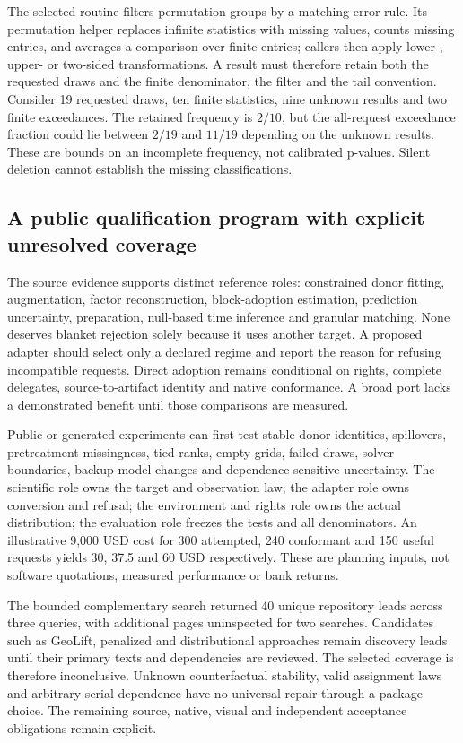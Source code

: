 The selected routine filters permutation groups by a matching-error rule.
Its permutation helper replaces infinite statistics with missing values,
counts missing entries, and averages a comparison over finite entries;
callers then apply lower-, upper- or two-sided transformations. A result
must therefore retain both the requested draws and the finite denominator,
the filter and the tail convention. Consider 19 requested draws, ten finite
statistics, nine unknown results and two finite exceedances. The retained
frequency is $2/10$, but the all-request exceedance fraction could lie
between $2/19$ and $11/19$ depending on the unknown results. These are bounds
on an incomplete frequency, not calibrated p-values. Silent deletion cannot
establish the missing classifications.~\citep{exec25_synthr_microsynth,
exec25_synthr_choice}

\subsection{A public qualification program with explicit unresolved coverage}
The source evidence supports distinct reference roles: constrained donor
fitting, augmentation, factor reconstruction, block-adoption estimation,
prediction uncertainty, preparation, null-based time inference and granular
matching. None deserves blanket rejection solely because it uses another
target. A proposed adapter should select only a declared regime and report
the reason for refusing incompatible requests. Direct adoption remains
conditional on rights, complete delegates, source-to-artifact identity and
native conformance. A broad port lacks a demonstrated benefit until those
comparisons are measured.~\citep{exec25_synthr_choice}

Public or generated experiments can first test stable donor identities,
spillovers, pretreatment missingness, tied ranks, empty grids, failed draws,
solver boundaries, backup-model changes and dependence-sensitive uncertainty.
The scientific role owns the target and observation law; the adapter role
owns conversion and refusal; the environment and rights role owns the actual
distribution; the evaluation role freezes the tests and all denominators.
An illustrative 9,000 USD cost for 300 attempted, 240 conformant and 150 useful
requests yields 30, 37.5 and 60 USD respectively. These are planning inputs,
not software quotations, measured performance or bank returns.
\citep{exec25_synthr_choice}

The bounded complementary search returned 40 unique repository leads across
three queries, with additional pages uninspected for two searches. Candidates
such as GeoLift, penalized and distributional approaches remain discovery
leads until their primary texts and dependencies are reviewed. The selected
coverage is therefore inconclusive. Unknown counterfactual stability, valid
assignment laws and arbitrary serial dependence have no universal repair
through a package choice. The remaining source, native, visual and independent
acceptance obligations remain explicit.~\citep{exec25_synthr_choice}


